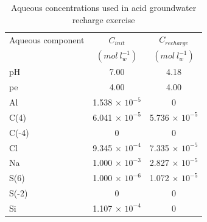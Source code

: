 \begin{table}
\caption{Aqueous concentrations used in acid groundwater recharge exercise}
\begin{center}
\begin{tabular}{l c c}
\hline
Aqueous  component        & $C_{init}$ & $C_{recharge}$      \\
                  & $(mol\ l^{-1}_w)$   & $(mol\ l^{-1}_w)$      \\ \hline
pH              &   7.00    &  4.18           \\
pe              &   4.00    &  4.00           \\
Al              &  1.538 $\times$ $10^{-5}$ & 0   \\
C(4)            &  6.041 $\times$ $10^{-5}$ & 5.736 $\times$ $10^{-5}$   \\
C(-4)           &  0                       &     0                     \\
Cl              &  9.345 $\times$ $10^{-4}$ & 7.335 $\times$ $10^{-5}$   \\
Na              &  1.000 $\times$ $10^{-3}$ & 2.827 $\times$ $10^{-5}$   \\
S(6)            &  1.000 $\times$ $10^{-6}$ & 1.072 $\times$ $10^{-5}$   \\
S(-2)           &     0             &     0               \\
Si              &  1.107 $\times$ $10^{-4}$ & 0  \\ \hline
\end{tabular}
\label{franken_caqu}
\end{center}
\end{table}


